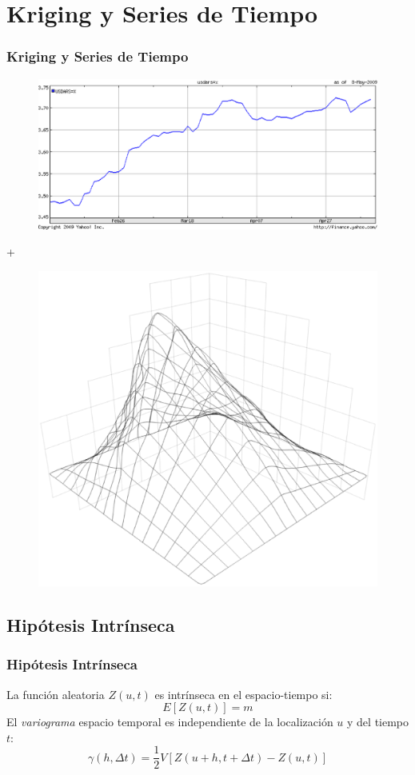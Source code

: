 \documentclass{beamer}
\begin{document}
\section{Kriging y Series de Tiempo}
\begin{frame}
\frametitle{Kriging y Series de Tiempo}
\begin{center}
\begin{figure}
\includegraphics[scale=0.15]{image/usdars.eps}
\end{figure}
+
\begin{figure}
\includegraphics[scale=0.1]{document/image/logo.eps}
\end{figure}
\end{center}
\end{frame}


\subsection{Hipótesis Intrínseca}
\begin{frame}
\frametitle{Hipótesis Intrínseca}
La función aleatoria $Z(u,t)$ es intrínseca en el espacio-tiempo si:
\begin{equation}
E[Z(u,t)] = m
\end{equation}
El \emph{variograma} espacio temporal es independiente de la localización $u$ y del tiempo $t$:
\begin{equation}
\gamma(h,\Delta t) = \frac{1}{2}V[Z(u+h,t+\Delta t) -Z(u,t)]
\end{equation}
\end{frame}
\end{document}
